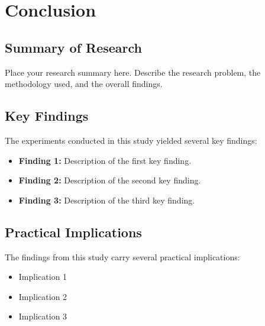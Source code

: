\chapter{Conclusion}


\section{Summary of Research}


Place your research summary here. Describe the research problem, the methodology used, and the overall findings.

\section{Key Findings}


The experiments conducted in this study yielded several key findings:

\begin{itemize}
    \item \textbf{Finding 1:} Description of the first key finding.
    \item \textbf{Finding 2:} Description of the second key finding.
    \item \textbf{Finding 3:} Description of the third key finding.
\end{itemize}

\section{Practical Implications}


The findings from this study carry several practical implications:
\begin{itemize}
    \item Implication 1
    \item Implication 2
    \item Implication 3
\end{itemize}

